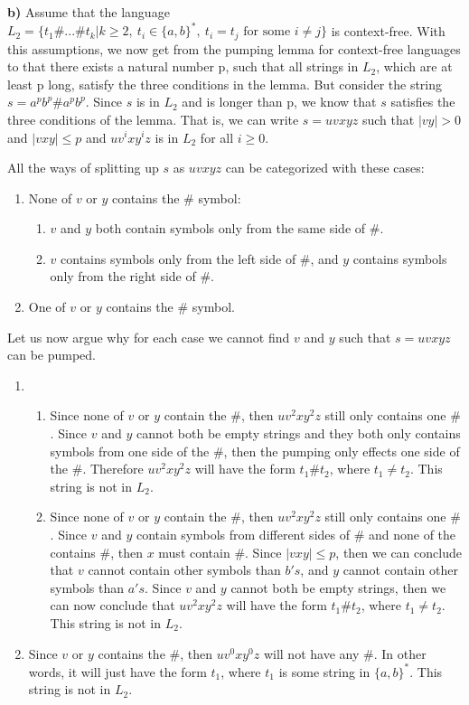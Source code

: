 \documentclass[12pt]{article}
\begin{document}
\textbf{b)} Assume that the language $L_2 = \{t_1\#...\#t_k| k\geq 2,\  t_i\in \{ a,b \}^*,\ t_i = t_j \text{ for some } i\neq j \}$ is context-free. With this assumptions, we now get from the pumping lemma for context-free languages to that there exists a natural number p, such that all strings in $L_2$, which are at least p long, satisfy the three conditions in the lemma. But consider the string $s=a^pb^p \# a^pb^p$. Since $s$ is in $L_2$ and is longer than p, we know that $s$ satisfies the three conditions of the lemma. That is, we can write $s=uvxyz$ such that $|vy|>0$ and $|vxy|\leq p$ and $uv^ixy^iz$ is in $L_2$ for all $i\geq 0$. 

All the ways of splitting up $s$ as $uvxyz$ can be categorized with these cases: 
\begin{enumerate}
\item None of $v$ or $y$ contains the $\#$ symbol:
\begin{enumerate}
\item $v$ and $y$ both contain symbols only from the same side of $\#$.
\item $v$ contains symbols only from the left side of $\#$, and $y$ contains symbols only from the right side of $\#$.
\end{enumerate} 
\item One of $v$ or $y$ contains the $\#$ symbol.
\end{enumerate}

Let us now argue why for each case we cannot find $v$ and $y$ such that $s=uvxyz$ can be pumped. \begin{enumerate}
\item
\begin{enumerate}
\item Since none of $v$ or $y$ contain the $\#$, then $uv^2xy^2z$ still only contains one $\#$. Since $v$ and $y$ cannot both be empty strings and they both only contains symbols from one side of the $\#$, then the pumping only effects one side of the $\#$. Therefore $uv^2xy^2z$ will have the form $t_1\#t_2$, where $t_1\neq t_2$. This string is not in $L_2$.
\item Since none of $v$ or $y$ contain the $\#$, then $uv^2xy^2z$ still only contains one $\#$. Since $v$ and $y$ contain symbols from different sides of $\#$ and none of the contains $\#$, then $x$ must contain $\#$. Since $|vxy|\leq p$, then we can conclude that $v$ cannot contain other symbols than $b's$, and $y$ cannot contain other symbols than $a's$. Since $v$ and $y$ cannot both be empty strings, then we can now conclude that $uv^2xy^2z$ will have the form $t_1\#t_2$, where $t_1\neq t_2$. This string is not in $L_2$.
\end{enumerate}
\item Since $v$ or $y$ contains the $\#$, then $uv^0xy^0z$ will not have any $\#$. In other words, it will just have the form $t_1$, where $t_1$ is some string in $\{a,b\}^*$. This string is not in $L_2$.
\end{enumerate}
\end{document}
